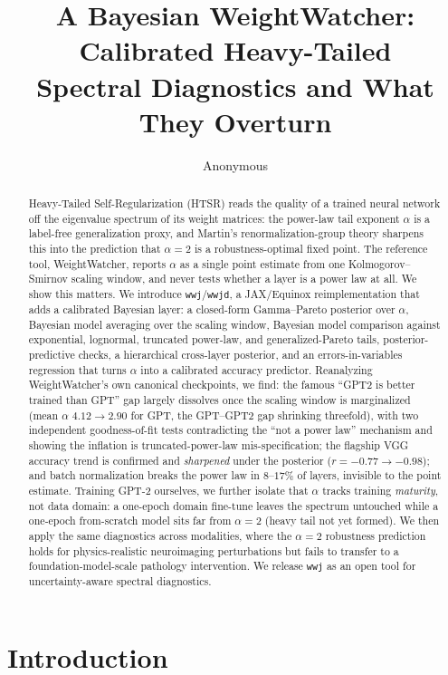 \documentclass{article} %
\title{A Bayesian WeightWatcher: Calibrated Heavy-Tailed\\
Spectral Diagnostics and What They Overturn}
\author{Anonymous}
\begin{document}
\maketitle

\begin{abstract}
Heavy-Tailed Self-Regularization (HTSR) reads the quality of a trained neural network
off the eigenvalue spectrum of its weight matrices: the power-law tail exponent $\alpha$
is a label-free generalization proxy, and Martin's renormalization-group theory sharpens
this into the prediction that $\alpha = 2$ is a robustness-optimal fixed point. The reference
tool, WeightWatcher, reports $\alpha$ as a single point estimate from one Kolmogorov--Smirnov
scaling window, and never tests whether a layer is a power law at all. We show this matters.
We introduce \texttt{wwj}/\texttt{wwjd}, a JAX/Equinox reimplementation that adds a calibrated
Bayesian layer: a closed-form Gamma--Pareto posterior over $\alpha$, Bayesian model averaging
over the scaling window, Bayesian model comparison against exponential, lognormal, truncated
power-law, and generalized-Pareto tails, posterior-predictive checks, a hierarchical
cross-layer posterior, and an errors-in-variables regression that turns $\alpha$ into a
calibrated accuracy predictor. Reanalyzing WeightWatcher's own canonical checkpoints, we find:
the famous ``GPT2 is better trained than GPT'' gap largely dissolves once the scaling window is
marginalized (mean $\alpha$ $4.12 \to 2.90$ for GPT, the GPT--GPT2 gap shrinking threefold),
with two independent goodness-of-fit tests contradicting the ``not a power law'' mechanism and
showing the inflation is truncated-power-law mis-specification; the flagship VGG accuracy trend
is confirmed and \emph{sharpened} under the posterior ($r{=}{-}0.77 \to {-}0.98$); and batch
normalization breaks the power law in $8$--$17\%$ of layers, invisible to the point estimate. Training
GPT-2 ourselves, we further isolate that $\alpha$ tracks training \emph{maturity}, not data domain: a
one-epoch domain fine-tune leaves the spectrum untouched while a one-epoch from-scratch model sits far from
$\alpha=2$ (heavy tail not yet formed). We
then apply the same diagnostics across modalities, where the $\alpha = 2$ robustness prediction
holds for physics-realistic neuroimaging perturbations but fails to transfer to a foundation-model-scale
pathology intervention. We release \texttt{wwj} as an open tool for uncertainty-aware spectral diagnostics.
\end{abstract}

\section{Introduction}
\label{sec:intro}
\end{document}
